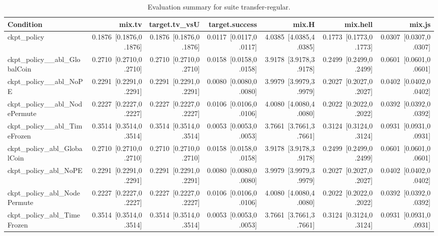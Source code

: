 \begin{table}[t]
\centering
\caption{Evaluation summary for suite transfer-regular.}
\label{tab:eval_transfer-regular}
\begin{tabular}{lrrrrrr}
\toprule
Condition & mix.tv & target.tv\_vsU & target.success & mix.H & mix.hell & mix.js \\
\midrule
ckpt\_policy & 0.1876~[0.1876,0.1876] & 0.1876~[0.1876,0.1876] & 0.0117~[0.0117,0.0117] & 4.0385~[4.0385,4.0385] & 0.1773~[0.1773,0.1773] & 0.0307~[0.0307,0.0307] \\
ckpt\_policy\_\_abl\_GlobalCoin & 0.2710~[0.2710,0.2710] & 0.2710~[0.2710,0.2710] & 0.0158~[0.0158,0.0158] & 3.9178~[3.9178,3.9178] & 0.2499~[0.2499,0.2499] & 0.0601~[0.0601,0.0601] \\
ckpt\_policy\_\_abl\_NoPE & 0.2291~[0.2291,0.2291] & 0.2291~[0.2291,0.2291] & 0.0080~[0.0080,0.0080] & 3.9979~[3.9979,3.9979] & 0.2027~[0.2027,0.2027] & 0.0402~[0.0402,0.0402] \\
ckpt\_policy\_\_abl\_NodePermute & 0.2227~[0.2227,0.2227] & 0.2227~[0.2227,0.2227] & 0.0106~[0.0106,0.0106] & 4.0080~[4.0080,4.0080] & 0.2022~[0.2022,0.2022] & 0.0392~[0.0392,0.0392] \\
ckpt\_policy\_\_abl\_TimeFrozen & 0.3514~[0.3514,0.3514] & 0.3514~[0.3514,0.3514] & 0.0053~[0.0053,0.0053] & 3.7661~[3.7661,3.7661] & 0.3124~[0.3124,0.3124] & 0.0931~[0.0931,0.0931] \\
ckpt\_policy\_abl\_GlobalCoin & 0.2710~[0.2710,0.2710] & 0.2710~[0.2710,0.2710] & 0.0158~[0.0158,0.0158] & 3.9178~[3.9178,3.9178] & 0.2499~[0.2499,0.2499] & 0.0601~[0.0601,0.0601] \\
ckpt\_policy\_abl\_NoPE & 0.2291~[0.2291,0.2291] & 0.2291~[0.2291,0.2291] & 0.0080~[0.0080,0.0080] & 3.9979~[3.9979,3.9979] & 0.2027~[0.2027,0.2027] & 0.0402~[0.0402,0.0402] \\
ckpt\_policy\_abl\_NodePermute & 0.2227~[0.2227,0.2227] & 0.2227~[0.2227,0.2227] & 0.0106~[0.0106,0.0106] & 4.0080~[4.0080,4.0080] & 0.2022~[0.2022,0.2022] & 0.0392~[0.0392,0.0392] \\
ckpt\_policy\_abl\_TimeFrozen & 0.3514~[0.3514,0.3514] & 0.3514~[0.3514,0.3514] & 0.0053~[0.0053,0.0053] & 3.7661~[3.7661,3.7661] & 0.3124~[0.3124,0.3124] & 0.0931~[0.0931,0.0931] \\
\bottomrule
\end{tabular}
\end{table}
